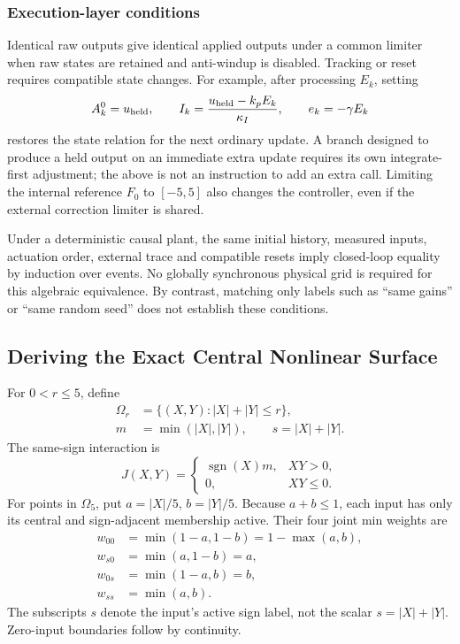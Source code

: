 \subsubsection{Execution-layer conditions}
Identical raw outputs give identical applied outputs under a common
limiter when raw states are retained and anti-windup is disabled.
Tracking or reset requires compatible state changes. For example, after
processing $E_k$, setting
\[
 A^0_k=u_{\rm held},\qquad
 I_k=\frac{u_{\rm held}-k_pE_k}{\kappa_I},\qquad
 e_k=-\gamma E_k
\]
restores the state relation for the next ordinary update. A branch designed
to produce a held output on an immediate extra update requires its own
integrate-first adjustment; the above is not an instruction to add an
extra call. Limiting the internal reference $F_0$ to $[-5,5]$ also changes
the controller, even if the external correction limiter is shared.

Under a deterministic causal plant, the same initial history, measured
inputs, actuation order, external trace and compatible resets imply
closed-loop equality by induction over events. No globally synchronous
physical grid is required for this algebraic equivalence. By contrast,
matching only labels such as ``same gains'' or ``same random seed'' does
not establish these conditions.

\subsection{Deriving the Exact Central Nonlinear Surface}
\label{subsec:fpi_mechanism}

For $0<r\le5$, define
\begin{align}
 \Omega_r&=\{(X,Y):|X|+|Y|\le r\},\nonumber\\
 m&=\min(|X|,|Y|),\qquad s=|X|+|Y|.
 \label{eq:fpi_domain}
\end{align}
The same-sign interaction is
\begin{equation}
 J(X,Y)=\begin{cases}\operatorname{sgn}(X)m,&XY>0,\\0,&XY\le0.\end{cases}
 \label{eq:fpi_interaction}
\end{equation}
For points in $\Omega_5$, put $a=|X|/5$, $b=|Y|/5$.
Because $a+b\le1$, each input has only its central and sign-adjacent
membership active. Their four joint min weights are
\begin{align}
 w_{00}&=\min(1-a,1-b)=1-\max(a,b),\nonumber\\
 w_{s0}&=\min(a,1-b)=a,\nonumber\\
 w_{0s}&=\min(1-a,b)=b,\nonumber\\
 w_{ss}&=\min(a,b).
 \label{eq:fpd_four_weights}
\end{align}
The subscripts $s$ denote the input's active sign label, not the scalar
$s=|X|+|Y|$. Zero-input boundaries follow by continuity.

